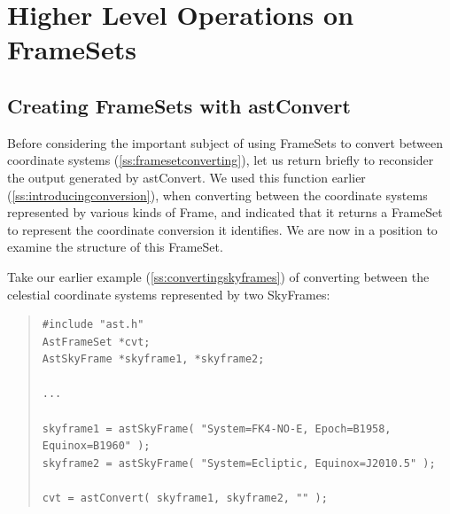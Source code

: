 \documentclass[twoside,11pt]{article}
\newcommand{\htmlref}[2]{#1}
\newcommand{\secref}[1]{\S\ref{#1}}
\renewcommand{\secref}[1]{\ref{#1}}
\begin{document}
\cleardoublepage
\section{\label{ss:fshigher}Higher Level Operations on FrameSets}

\subsection{\label{ss:framesetsfromconvert}Creating FrameSets with astConvert}

Before considering the important subject of using FrameSets to convert
between coordinate systems (\secref{ss:framesetconverting}), let us
return briefly to reconsider the output generated by \htmlref{astConvert}{astConvert}. We
used this function earlier (\secref{ss:introducingconversion}), when
converting between the coordinate systems represented by various kinds
of \htmlref{Frame}{Frame}, and indicated that it returns a \htmlref{FrameSet}{FrameSet} to represent the
coordinate conversion it identifies. We are now in a position to
examine the structure of this FrameSet.

Take our earlier example (\secref{ss:convertingskyframes}) of
converting between the celestial coordinate systems represented by two
SkyFrames:

\begin{quote}
\small
\begin{verbatim}
#include "ast.h"
AstFrameSet *cvt;
AstSkyFrame *skyframe1, *skyframe2;

...

skyframe1 = astSkyFrame( "System=FK4-NO-E, Epoch=B1958, Equinox=B1960" );
skyframe2 = astSkyFrame( "System=Ecliptic, Equinox=J2010.5" );

cvt = astConvert( skyframe1, skyframe2, "" );
\end{verbatim}
\normalsize
\end{quote}
\end{document}
